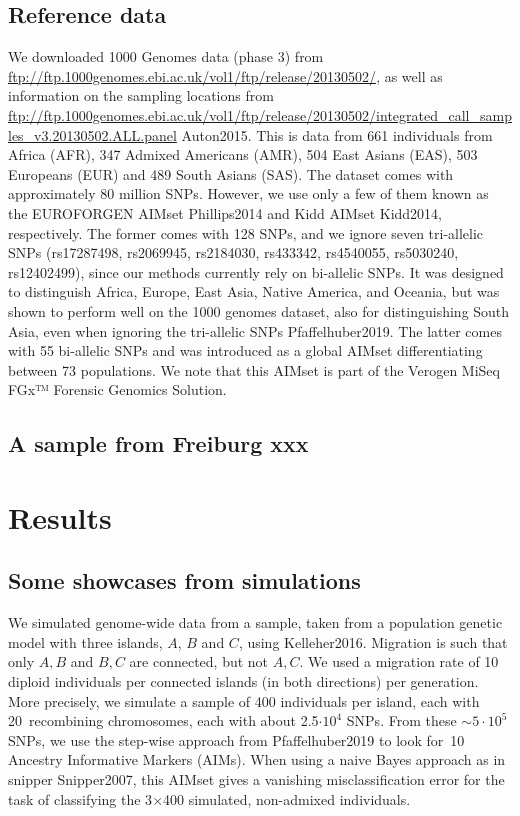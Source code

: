 \documentclass[12pt]{article}
\theoremstyle{definition}
\begin{document}
\subsection{Reference data}
\sloppy We downloaded 1000 Genomes data (phase 3) from
\url{ftp://ftp.1000genomes.ebi.ac.uk/vol1/ftp/release/20130502/}, as
well as information on the sampling locations from
\url{ftp://ftp.1000genomes.ebi.ac.uk/vol1/ftp/release/20130502/integrated_call_samples_v3.20130502.ALL.panel}
\cite{article}{Auton2015}. This is data from 661 individuals from Africa (AFR),
347 Admixed Americans (AMR), 504 East Asians (EAS), 503 Europeans
(EUR) and 489 South Asians (SAS). The dataset comes with approximately
80 million SNPs. However, we use only a few of them known as the
EUROFORGEN AIMset \cite{article}{Phillips2014} and Kidd AIMset \cite{article}{Kidd2014},
respectively. The former comes with 128 SNPs, and we ignore seven
tri-allelic SNPs (rs17287498, rs2069945, rs2184030, rs433342,
rs4540055, rs5030240, rs12402499), since our methods currently rely on
bi-allelic SNPs. It was designed to distinguish Africa, Europe, East
Asia, Native America, and Oceania, but was shown to perform well on
the 1000 genomes dataset, also for distinguishing South Asia, even
when ignoring the tri-allelic SNPs \cite{article}{Pfaffelhuber2019}.  The
latter comes with 55 bi-allelic SNPs and was introduced as a global
AIMset differentiating between 73 populations. We note that this
AIMset is part of the Verogen MiSeq FGx™ Forensic Genomics Solution.

\subsection{A sample from Freiburg xxx}

\section{Results}

\subsection{Some showcases from simulations}
We simulated genome-wide data from a sample, taken from a population
genetic model with three islands, $A$, $B$ and $C$, using
\cite{article}{Kelleher2016}. Migration is such that only $A, B$ and $B, C$ are
connected, but not $A, C$. We used a migration rate of 10 diploid
individuals per connected islands (in both directions) per
generation. More precisely, we simulate a sample of 400 individuals
per island, each with 20~recombining chromosomes, each with about
2.5$\cdot 10^4$ SNPs. From these $\sim 5\cdot 10^5$ SNPs, we use the
step-wise approach from \cite{article}{Pfaffelhuber2019} to look for~10
Ancestry Informative Markers (AIMs). When using a naive Bayes approach
as in {\sc snipper} \cite{article}{Snipper2007}, this AIMset gives a vanishing
misclassification error for the task of classifying the 3$\times$400
simulated, non-admixed individuals.
\end{document}
